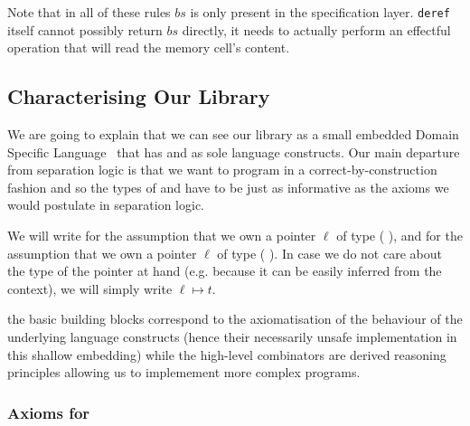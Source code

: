Note that in all of these rules $\mathit{bs}$ is only present
in the specification layer. \texttt{deref} itself cannot possibly
return $\mathit{bs}$ directly, it needs to actually perform an
effectful operation that will read the memory cell's content.

\subsection{Characterising Our Library}

We are going to explain that we can see our library as a small
embedded Domain Specific
Language~\cite{DBLP:journals/csur/Hudak96}
that has  and  as
sole language constructs.
%
Our main departure from separation logic is that we want to
program in a correct-by-construction fashion and so the types
of  and  have to be
just as informative as the axioms we would postulate
in separation logic.

We will write  for the assumption
that we own a pointer $\ell$ of type
(   ),
and  for the assumption that we own
a pointer $\ell$ of type (  ).
%
In case we do not care about the type of the pointer at hand
(e.g. because it can be easily inferred from the context), we
will simply write $\ell \mapsto t$.

the basic building blocks correspond to the axiomatisation of
the behaviour of the underlying language constructs (hence their
necessarily unsafe implementation in this shallow embedding)
while the high-level combinators are derived reasoning principles
allowing us to implemement more complex programs.

\subsubsection{Axioms for }


